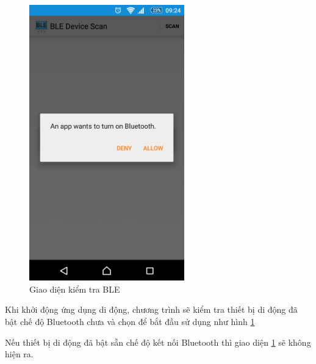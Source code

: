 

	\begin{figure}[H]
		\centering    
		\includegraphics[width=0.6\textwidth]{androidoff}
		\caption[Giao diện kiểm tra BLE]{Giao diện kiểm tra BLE}
		\label{fig: androidoff}
	\end{figure}
Khi khởi động ứng dụng di động, chương trình sẽ kiểm tra thiết bị di động đã bật chế độ Bluetooth chưa và chọn để bắt đầu sử dụng như hình \ref{fig: androidoff}

Nếu thiết bị di động đã bật sẵn chế độ kết nối Bluetooth thì giao diện \ref{fig: androidoff} sẽ không hiện ra.

